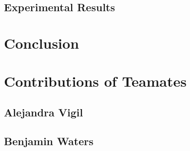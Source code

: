 \documentclass[]{IEEEphot}
\begin{document}
\subsection{Experimental Results} 


\section{Conclusion}
  

\section*{Contributions of Teamates}
\subsection*{Alejandra Vigil}
\subsection*{Benjamin Waters}






\end{document}
